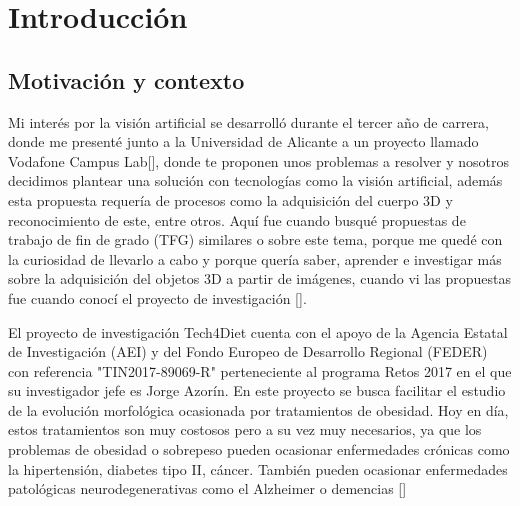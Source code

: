 
\chapter{Introducción}

\section{Motivación y contexto}


	Mi interés por la visión artificial se desarrolló durante el tercer año de carrera, donde me presenté junto a la Universidad de Alicante a un proyecto llamado Vodafone Campus Lab[\cite{Vodafone}], donde te proponen unos problemas a resolver y nosotros decidimos plantear una solución con tecnologías como la visión artificial, además esta propuesta requería de procesos como la adquisición del cuerpo 3D y reconocimiento de este, entre otros. Aquí fue cuando busqué propuestas de trabajo de fin de grado (TFG) similares o sobre este tema, porque me quedé con la curiosidad de llevarlo a cabo y porque quería saber, aprender e investigar más sobre la adquisición del objetos 3D a partir de imágenes, cuando vi las propuestas fue cuando conocí el proyecto de investigación [\cite{tech}].
 
	El proyecto de investigación Tech4Diet cuenta con el apoyo de la Agencia Estatal de Investigación (AEI) y del Fondo Europeo de Desarrollo Regional (FEDER) con referencia "TIN2017-89069-R" perteneciente al programa Retos 2017 en el que su investigador jefe es Jorge Azorín. En este proyecto se busca facilitar el estudio de la evolución morfológica ocasionada por tratamientos de obesidad. Hoy en día, estos tratamientos son muy costosos pero a su vez muy necesarios, ya que los problemas de obesidad o sobrepeso pueden ocasionar enfermedades crónicas como la hipertensión, diabetes tipo II, cáncer. También pueden ocasionar enfermedades patológicas neurodegenerativas como el Alzheimer o demencias [\cite{Andres1}]


